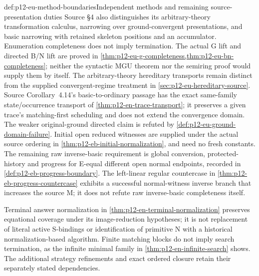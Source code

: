 \begin{proofboundary}{def:p12-eu-method-boundaries}{Independent methods and remaining source-presentation duties}
Source \S4 also distinguishes its arbitrary-theory transformation
calculus, narrowing over ground-convergent presentations, and basic
narrowing with retained skeleton positions and an accumulator.
Enumeration completeness does not imply termination. The actual G
lift and directed B/N lift are proved in
\cref{thm:p12-eu-g-completeness,thm:p12-eu-bn-completeness}; neither
the syntactic MGU theorem nor the semiring proof would supply them
by itself. The arbitrary-theory hereditary transports remain distinct
from the supplied convergent-regime treatment in
\cref{sec:p12-eu-hereditary-source}. Source Corollary~4.14's
basic-to-ordinary passage has the exact same-family state/occurrence
transport of \cref{thm:p12-en-trace-transport}; it preserves a given
trace's matching-first scheduling and does not extend the convergence
domain. The weaker original-ground directed claim is refuted by
\cref{def:p12-eu-ground-domain-failure}. Initial open reduced witnesses
are supplied under the actual source ordering in
\cref{thm:p12-eb-initial-normalization}, and need no fresh constants.
The remaining raw inverse-basic requirement is global conversion,
protected-history and progress for E-equal different open normal
endpoints, recorded in \cref{def:p12-eb-progress-boundary}.
The left-linear regular countercase in
\cref{thm:p12-eb-progress-countercase} exhibits a successful
normal-witness inverse branch that increases the source M; it
does not refute raw inverse-basic completeness itself.

Terminal answer normalization in
\cref{thm:p12-en-terminal-normalization} preserves equational
coverage under its image-reduction hypotheses; it is not replacement
of literal active S-bindings or identification of primitive N with
a historical normalization-based algorithm. Finite matching blocks
do not imply search termination, as the infinite minimal family in
\cref{thm:p12-en-infinite-search} shows. The additional strategy
refinements and exact ordered closure retain their separately stated
dependencies.
\cite[\S4, pp.~488--503]{BaaderSnyder2001}
\end{proofboundary}
